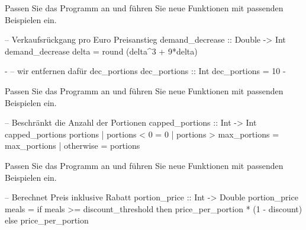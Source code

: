 \addtocounter{exercise}{-1}\addtocounter{solve}{-1}%
\begin{frame}
    \begin{exercise}[c)]
        Passen Sie das Programm an und führen Sie neue Funktionen mit passenden Beispielen ein.
    \end{exercise}
    \begin{solve}
    \begin{plainhaskell}
-- Verkaufsrückgang pro Euro Preisanstieg
demand_decrease :: Double -> Int
demand_decrease delta = round (delta^3 + 9*delta)

{-
-- wir entfernen dafür dec_portions
dec_portions :: Int
dec_portions = 10
-}
    \end{plainhaskell}
    \end{solve}
\end{frame}
\addtocounter{exercise}{-1}\addtocounter{solve}{-1}%
\begin{frame}
    \begin{exercise}[c)]
        Passen Sie das Programm an und führen Sie neue Funktionen mit passenden Beispielen ein.
    \end{exercise}
    \begin{solve}
    \begin{plainhaskell}
-- Beschränkt die Anzahl der Portionen
capped_portions :: Int -> Int
capped_portions portions
    | portions < 0            = 0
    | portions > max_portions = max_portions
    | otherwise               = portions
    \end{plainhaskell}
    \end{solve}
\end{frame}
\addtocounter{exercise}{-1}\addtocounter{solve}{-1}%
\begin{frame}
    \begin{exercise}[c)]
        Passen Sie das Programm an und führen Sie neue Funktionen mit passenden Beispielen ein.
    \end{exercise}
    \begin{solve}
    \begin{plainhaskell}
-- Berechnet Preis inklusive Rabatt
portion_price :: Int -> Double
portion_price meals =
    if meals >= discount_threshold
    then price_per_portion * (1 - discount)
    else price_per_portion
    \end{plainhaskell}
    \end{solve}
\end{frame}
